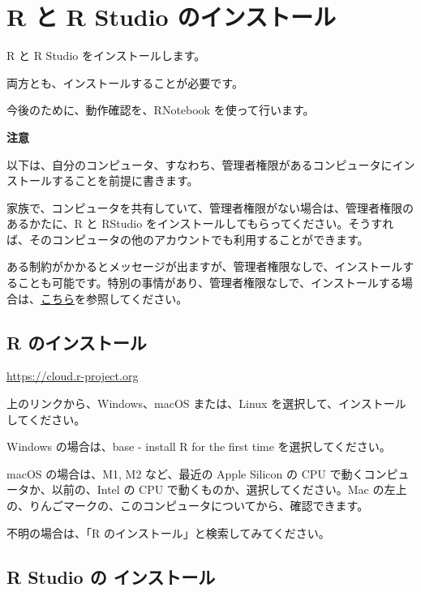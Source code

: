 \documentclass[
  xelatex, ja=standard]{bxjsbook}
\theoremstyle{definition}
\theoremstyle{definition}
\theoremstyle{definition}
\theoremstyle{definition}
\theoremstyle{remark}
\begin{document}
\hypertarget{r-ux3068-r-studio-ux306eux30a4ux30f3ux30b9ux30c8ux30fcux30eb}{%
\section{R と R Studio のインストール}\label{r-ux3068-r-studio-ux306eux30a4ux30f3ux30b9ux30c8ux30fcux30eb}}

R と R Studio をインストールします。

両方とも、インストールすることが必要です。

今後のために、動作確認を、RNotebook を使って行います。

\textbf{注意}

以下は、自分のコンピュータ、すなわち、管理者権限があるコンピュータにインストールすることを前提に書きます。

家族で、コンピュータを共有していて、管理者権限がない場合は、管理者権限のあるかたに、R と RStudio をインストールしてもらってください。そうすれば、そのコンピュータの他のアカウントでも利用することができます。

ある制約がかかるとメッセージが出ますが、管理者権限なしで、インストールすることも可能です。特別の事情があり、管理者権限なしで、インストールする場合は、\href{https://icu-hsuzuki.github.io/myds/techmemo.html\#\%E9\%9D\%9E\%E7\%AE\%A1\%E7\%90\%86\%E8\%80\%85\%E3\%81\%A8\%E3\%81\%97\%E3\%81\%A6-r-\%E3\%81\%A8-rstudio-\%E3\%82\%92\%E3\%82\%A4\%E3\%83\%B3\%E3\%82\%B9\%E3\%83\%88\%E3\%83\%BC\%E3\%83\%AB}{こちら}を参照してください。

\hypertarget{r-ux306eux30a4ux30f3ux30b9ux30c8ux30fcux30eb}{%
\subsection{R のインストール}\label{r-ux306eux30a4ux30f3ux30b9ux30c8ux30fcux30eb}}

\url{https://cloud.r-project.org}

上のリンクから、Windows、macOS または、Linux を選択して、インストールしてください。

Windows の場合は、base - install R for the first time を選択してください。

macOS の場合は、M1, M2 など、最近の Apple Silicon の CPU で動くコンピュータか、以前の、Intel の CPU で動くものか、選択してください。Mac の左上の、りんごマークの、このコンピュータについてから、確認できます。

不明の場合は、「R のインストール」と検索してみてください。

\hypertarget{r-studio-ux306e-ux30a4ux30f3ux30b9ux30c8ux30fcux30eb}{%
\subsection{R Studio の インストール}\label{r-studio-ux306e-ux30a4ux30f3ux30b9ux30c8ux30fcux30eb}}
\end{document}
